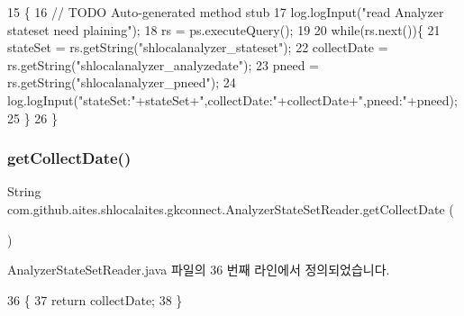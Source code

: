 \begin{DoxyCode}
15                                                      \{
16         \textcolor{comment}{// TODO Auto-generated method stub}
17         log.logInput(\textcolor{stringliteral}{"read Analyzer stateset need plaining"});
18         rs = ps.executeQuery();
19         
20         \textcolor{keywordflow}{while}(rs.next())\{                                
21             stateSet = rs.getString(\textcolor{stringliteral}{"shlocalanalyzer\_stateset"});
22             collectDate = rs.getString(\textcolor{stringliteral}{"shlocalanalyzer\_analyzedate"});
23             pneed = rs.getString(\textcolor{stringliteral}{"shlocalanalyzer\_pneed"});
24             log.logInput(\textcolor{stringliteral}{"stateSet:"}+stateSet+\textcolor{stringliteral}{",collectDate:"}+collectDate+\textcolor{stringliteral}{",pneed:"}+pneed);
25          \}  
26     \}
\end{DoxyCode}
\mbox{\label{classcom_1_1github_1_1aites_1_1shlocalaites_1_1gkconnect_1_1_analyzer_state_set_reader_a90abb13834ad933cc09a1c89ecafdf66}} 
\subsubsection{\texorpdfstring{get\+Collect\+Date()}{getCollectDate()}}
{\footnotesize\ttfamily String com.\+github.\+aites.\+shlocalaites.\+gkconnect.\+Analyzer\+State\+Set\+Reader.\+get\+Collect\+Date (\begin{DoxyParamCaption}{ }\end{DoxyParamCaption})}



Analyzer\+State\+Set\+Reader.\+java 파일의 36 번째 라인에서 정의되었습니다.


\begin{DoxyCode}
36                                   \{
37         \textcolor{keywordflow}{return} collectDate;
38     \}
\end{DoxyCode}
\mbox{\label{classcom_1_1github_1_1aites_1_1shlocalaites_1_1gkconnect_1_1_analyzer_state_set_reader_ae974cbeca920a531e20aba6e7e6963e7}} 
